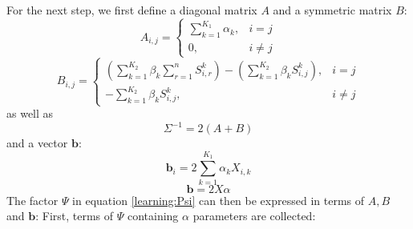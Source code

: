 For the next step, we first define a diagonal matrix $A$ and a symmetric matrix $B$:
\begin{equation}
A_{i,j}=
\begin{cases}
\sum_{k=1}^{K_1} \alpha_k, & i=j\\
0, & i \neq j
\end{cases}
\end{equation}
\begin{equation}
B_{i,j} = 
\begin{cases}
(\sum_{k=1}^{K_2}\beta_k \sum_{r=1}^{n} S_{i,r}^k) - (\sum_{k=1}^{K_2} \beta_k S_{i,j}^{k}), & i=j \\
-\sum_{k=1}^{K_2} \beta_k S_{i,j}^k, & i \neq j
\end{cases}
\end{equation}
as well as 
\begin{equation}
\Sigma^{-1} = 2(A+B)
\end{equation}
and a vector $\boldsymbol{b}$:
\begin{equation}
\boldsymbol{b}_i = 2 \sum \limits_{k=1}^{K_1} \alpha_k X_{i,k}
\end{equation}
\begin{equation}
\boldsymbol{b} = 2X\alpha
\end{equation}
The factor $\Psi$ in equation \ref{learning:Psi} can then be expressed in terms of $A, B$ and $\boldsymbol{b}$:
First, terms of $\Psi$ containing $\alpha$ parameters are collected:

